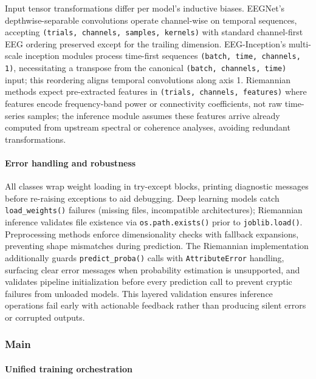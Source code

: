 \documentclass[12pt]{report}
\begin{document}
Input tensor transformations differ per model's inductive biases. EEGNet's depthwise-separable convolutions operate channel-wise on temporal sequences, accepting \texttt{(trials, channels, samples, kernels)} with standard channel-first EEG ordering preserved except for the trailing dimension. EEG-Inception's multi-scale inception modules process time-first sequences \texttt{(batch, time, channels, 1)}, necessitating a transpose from the canonical \texttt{(batch, channels, time)} input; this reordering aligns temporal convolutions along axis 1. Riemannian methods expect pre-extracted features in \texttt{(trials, channels, features)} where features encode frequency-band power or connectivity coefficients, not raw time-series samples; the inference module assumes these features arrive already computed from upstream spectral or coherence analyses, avoiding redundant transformations.

\paragraph{Error handling and robustness}\mbox{}

All classes wrap weight loading in try-except blocks, printing diagnostic messages before re-raising exceptions to aid debugging. Deep learning models catch \texttt{load\_weights()} failures (missing files, incompatible architectures); Riemannian inference validates file existence via \texttt{os.path.exists()} prior to \texttt{joblib.load()}. Preprocessing methods enforce dimensionality checks with fallback expansions, preventing shape mismatches during prediction. The Riemannian implementation additionally guards \texttt{predict\_proba()} calls with \texttt{AttributeError} handling, surfacing clear error messages when probability estimation is unsupported, and validates pipeline initialization before every prediction call to prevent cryptic failures from unloaded models. This layered validation ensures inference operations fail early with actionable feedback rather than producing silent errors or corrupted outputs.


\subsubsection{Main}

\paragraph{Unified training orchestration}\mbox{}
\end{document}
